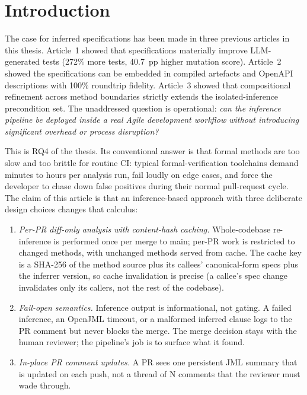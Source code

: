 \section{Introduction}
\label{sec:introduction}

The case for inferred specifications has been made in three previous articles in this thesis. Article~1 showed that specifications materially improve LLM-generated tests (272\% more tests, 40.7~pp higher mutation score). Article~2 showed the specifications can be embedded in compiled artefacts and OpenAPI descriptions with 100\% roundtrip fidelity. Article~3 showed that compositional refinement across method boundaries strictly extends the isolated-inference precondition set. The unaddressed question is operational: \emph{can the inference pipeline be deployed inside a real Agile development workflow without introducing significant overhead or process disruption?}

This is RQ4 of the thesis. Its conventional answer is that formal methods are too slow and too brittle for routine CI: typical formal-verification toolchains demand minutes to hours per analysis run, fail loudly on edge cases, and force the developer to chase down false positives during their normal pull-request cycle. The claim of this article is that an inference-based approach with three deliberate design choices changes that calculus:

\begin{enumerate}
    \item \emph{Per-PR diff-only analysis with content-hash caching.} Whole-codebase re-inference is performed once per merge to main; per-PR work is restricted to changed methods, with unchanged methods served from cache. The cache key is a SHA-256 of the method source plus its callees' canonical-form specs plus the inferrer version, so cache invalidation is precise (a callee's spec change invalidates only its callers, not the rest of the codebase).
    \item \emph{Fail-open semantics.} Inference output is informational, not gating. A failed inference, an OpenJML timeout, or a malformed inferred clause logs to the PR comment but never blocks the merge. The merge decision stays with the human reviewer; the pipeline's job is to surface what it found.
    \item \emph{In-place PR comment updates.} A PR sees one persistent JML summary that is updated on each push, not a thread of N comments that the reviewer must wade through.
\end{enumerate}

